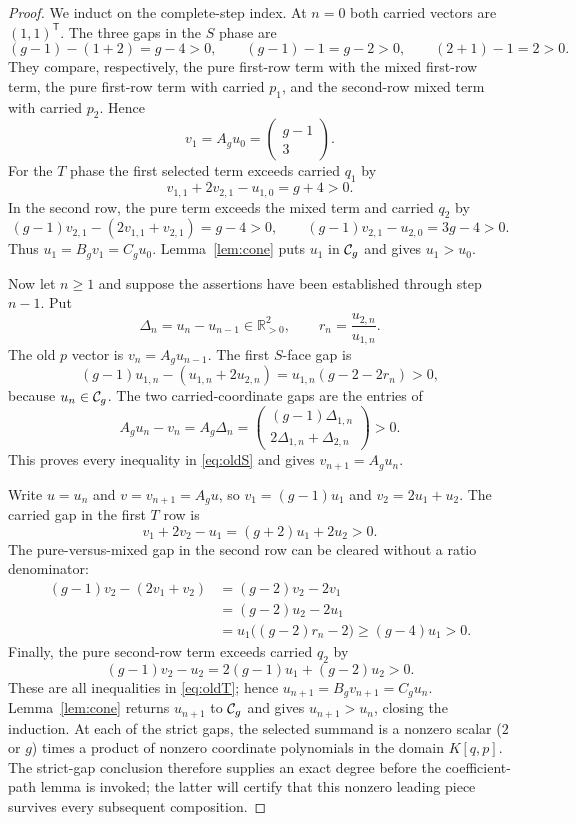 \documentclass[11pt]{article}
\theoremstyle{remark}
\numberwithin{equation}{section}
\begin{document}
\begin{proof}
We induct on the complete-step index.  At $n=0$ both carried vectors are
$(1,1)^{\mathsf T}$.  The three gaps in the $S$ phase are
\[
 (g-1)-(1+2)=g-4>0,\qquad
 (g-1)-1=g-2>0,\qquad
 (2+1)-1=2>0.
\]
They compare, respectively, the pure first-row term with the mixed first-row
term, the pure first-row term with carried $p_1$, and the second-row mixed
term with carried $p_2$.  Hence
\[
 v_1=A_gu_0=\begin{pmatrix}g-1\\3\end{pmatrix}.
\]
For the $T$ phase the first selected term exceeds carried $q_1$ by
\[
 v_{1,1}+2v_{2,1}-u_{1,0}=g+4>0.
\]
In the second row, the pure term exceeds the mixed term and carried $q_2$ by
\[
 (g-1)v_{2,1}-(2v_{1,1}+v_{2,1})=g-4>0,
 \qquad (g-1)v_{2,1}-u_{2,0}=3g-4>0.
\]
Thus $u_1=B_gv_1=C_gu_0$.  Lemma~\ref{lem:cone} puts $u_1$ in $\mathcal{C}_g$
and gives $u_1>u_0$.

Now let $n\geq1$ and suppose the assertions have been established through
step $n-1$.  Put
\[
 \Delta_n=u_n-u_{n-1}\in\mathbb R_{>0}^2,
 \qquad r_n=\frac{u_{2,n}}{u_{1,n}}.
\]
The old $p$ vector is $v_n=A_gu_{n-1}$.  The first $S$-face gap is
\[
 (g-1)u_{1,n}-(u_{1,n}+2u_{2,n})
 =u_{1,n}(g-2-2r_n)>0,
\]
because $u_n\in\mathcal{C}_g$.  The two carried-coordinate gaps are the entries of
\[
 A_gu_n-v_n=A_g\Delta_n
 =\begin{pmatrix}(g-1)\Delta_{1,n}\\
                  2\Delta_{1,n}+\Delta_{2,n}
   \end{pmatrix}>0.
\]
This proves every inequality in \eqref{eq:oldS} and gives
$v_{n+1}=A_gu_n$.

Write $u=u_n$ and $v=v_{n+1}=A_gu$, so
$v_1=(g-1)u_1$ and $v_2=2u_1+u_2$.  The carried gap in the first $T$ row is
\[
 v_1+2v_2-u_1=(g+2)u_1+2u_2>0.
\]
The pure-versus-mixed gap in the second row can be cleared without a ratio
denominator:
\begin{align*}
 (g-1)v_2-(2v_1+v_2)
 &= (g-2)v_2-2v_1\\
 &= (g-2)u_2-2u_1\\
 &=u_1\bigl((g-2)r_n-2\bigr)
 \geq(g-4)u_1>0.
\end{align*}
Finally, the pure second-row term exceeds carried $q_2$ by
\[
 (g-1)v_2-u_2=2(g-1)u_1+(g-2)u_2>0.
\]
These are all inequalities in \eqref{eq:oldT}; hence
$u_{n+1}=B_gv_{n+1}=C_gu_n$.  Lemma~\ref{lem:cone} returns $u_{n+1}$ to
$\mathcal{C}_g$ and gives $u_{n+1}>u_n$, closing the induction.
At each of the strict gaps, the selected summand is a nonzero scalar
(\(2\) or \(g\)) times a product of nonzero coordinate polynomials in the
domain \(K[q,p]\).  The strict-gap conclusion therefore supplies an exact
degree before the coefficient-path lemma is invoked; the latter will certify
that this nonzero leading piece survives every subsequent composition.
\end{proof}
\end{document}
